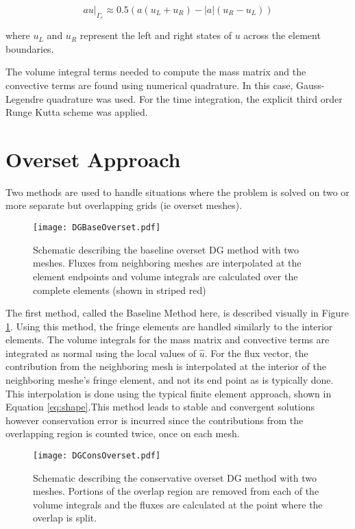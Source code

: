 \documentclass[11pt]{article}
\begin{document}
\begin{equation}
a u|_{\Gamma_e} \approx 0.5( a (u_L + u_R) - |a| (u_R-u_L))
\label{eq:upwind}
\end{equation} 

\noindent where $u_L$ and $u_R$ represent the left and right states of $u$ across
the element boundaries. 

The volume integral terms needed to compute the mass matrix and the convective
terms are found using numerical quadrature. In this case, Gauss-Legendre quadrature
was used. For the time integration, the explicit third order Runge Kutta scheme
was applied.  

\section{Overset Approach}

Two methods are used to handle situations where the problem is solved on two or more
separate but overlapping grids (ie overset meshes). 

\begin{figure}[t]
\centering
  \texttt{[image: DGBaseOverset.pdf]}
  \caption{Schematic describing the baseline overset DG method with two meshes. Fluxes from neighboring meshes are interpolated at the element endpoints and volume integrals are calculated over the complete elements (shown in striped red)}
  \label{fig:base}
\end{figure}

The first method, called the Baseline Method here, is described visually in Figure \ref{fig:base}. 
Using this method, the fringe elements are handled similarly to the interior elements. The volume
integrals for the mass matrix and convective terms are integrated as normal using the local values 
of $\hat{u}$. For the flux vector, the contribution from the neighboring mesh is interpolated
at the interior of the neighboring meshe's fringe element, and not its end point as is typically done. 
This interpolation is done using the typical finite element approach, shown in Equation 
\eqref{eq:shape}.This method leads to stable and convergent solutions
however conservation error is incurred since the contributions from the overlapping region is counted
twice, once on each mesh.

\begin{figure}[h]
\centering
  \texttt{[image: DGConsOverset.pdf]}
  \caption{Schematic describing the conservative overset DG method with two meshes. Portions of the overlap region are removed from each of the volume integrals and the fluxes are calculated at the point where the overlap is split.}
  \label{fig:cons}
\end{figure}
\end{document}
